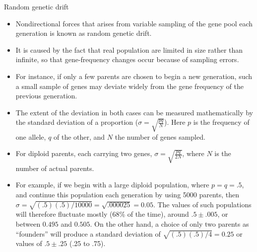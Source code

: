 \documentclass[11pt,dvipsnames,ignorenonframetext,aspectratio=169]{beamer}
\providecommand{\tightlist}{%
  \setlength{\itemsep}{0pt}\setlength{\parskip}{0pt}}
\begin{document}
\begin{frame}{Random genetic drift}
\protect\hypertarget{random-genetic-drift}{}

\small

\begin{itemize}
\tightlist
\item
  Nondirectional forces that arises from variable sampling of the gene
  pool each generation is known as random genetic drift.
\item
  It is caused by the fact that real population are limited in size
  rather than infinite, so that gene-frequency changes occur because of
  sampling errors.
\item
  For instance, if only a few parents are chosen to begin a new
  generation, such a small sample of genes may deviate widely from the
  gene frequency of the previous generation.
\item
  The extent of the deviation in both cases can be measured
  mathematically by the standard deviation of a proportion
  (\(\sigma = \sqrt{\frac{pq}{N}}\)). Here \(p\) is the frequency of one
  allele, \(q\) of the other, and \(N\) the number of genes sampled.
\item
  For diploid parents, each carrying two genes,
  \(\sigma = \sqrt{\frac{pq}{2N}}\), where \(N\) is the number of actual
  parents.
\item
  For example, if we begin with a large diploid population, where
  \(p = q = .5\), and continue this population each generation by using
  5000 parents, then
  \(\sigma = \sqrt{(.5)(.5)/10000} = \sqrt{.000025} = 0.05\). The values
  of such populations will therefore fluctuate mostly (68\% of the
  time), around \(.5 \pm .005\), or between \(0.495\) and \(0.505\). On
  the other hand, a choice of only two parents as ``founders'' will
  produce a standard deviation of \(\sqrt{(.5)(.5)/4} = 0.25\) or values
  of \(.5 \pm .25\) (.25 to .75).
\end{itemize}

\end{frame}
\end{document}

